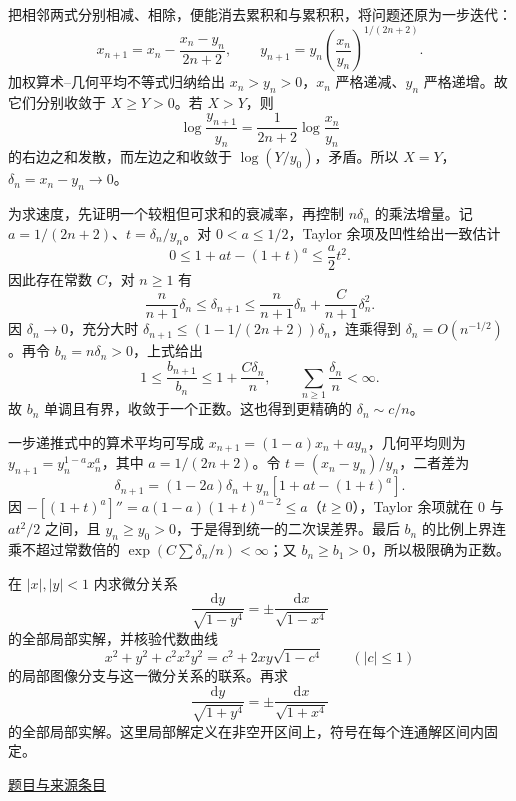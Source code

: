 \documentclass[12pt,fontset=fandol]{ctexart}
\begin{document}
\begin{solve}\label{ans:fin16-low:9}

把相邻两式分别相减、相除，便能消去累积和与累积积，将问题还原为一步迭代：
\[
x_{n+1}=x_n-\frac{x_n-y_n}{2n+2},\qquad
y_{n+1}=y_n\left(\frac{x_n}{y_n}\right)^{1/(2n+2)}.
\]
加权算术--几何平均不等式归纳给出 $x_n>y_n>0$，$x_n$ 严格递减、$y_n$ 严格递增。故它们分别收敛于 $X\ge Y>0$。若 $X>Y$，则
\[
\log\frac{y_{n+1}}{y_n}=\frac1{2n+2}\log\frac{x_n}{y_n}
\]
的右边之和发散，而左边之和收敛于 $\log(Y/y_0)$，矛盾。所以 $X=Y$，$\delta_n=x_n-y_n\to0$。

为求速度，先证明一个较粗但可求和的衰减率，再控制 $n\delta_n$ 的乘法增量。记 $a=1/(2n+2)$、$t=\delta_n/y_n$。对 $0<a\le1/2$，Taylor 余项及凹性给出一致估计
\[
0\le1+at-(1+t)^a\le\frac a2t^2.
\]
因此存在常数 $C$，对 $n\ge1$ 有
\[
\frac n{n+1}\delta_n\le\delta_{n+1}
\le\frac n{n+1}\delta_n+\frac C{n+1}\delta_n^2.
\]
因 $\delta_n\to0$，充分大时 $\delta_{n+1}\le(1-1/(2n+2))\delta_n$，连乘得到 $\delta_n=O(n^{-1/2})$。再令 $b_n=n\delta_n>0$，上式给出
\[
1\le\frac{b_{n+1}}{b_n}\le1+\frac{C\delta_n}{n},
\qquad\sum_{n\ge1}\frac{\delta_n}{n}<\infty.
\]
故 $b_n$ 单调且有界，收敛于一个正数。这也得到更精确的 $\delta_n\sim c/n$。

一步递推式中的算术平均可写成 $x_{n+1}=(1-a)x_n+ay_n$，几何平均则为 $y_{n+1}=y_n^{1-a}x_n^a$，其中 $a=1/(2n+2)$。令 $t=(x_n-y_n)/y_n$，二者差为
\[
\delta_{n+1}=(1-2a)\delta_n+y_n[1+at-(1+t)^a].
\]
因 $-[(1+t)^a]''=a(1-a)(1+t)^{a-2}\le a$（$t\ge0$），Taylor 余项就在 $0$ 与 $at^2/2$ 之间，且 $y_n\ge y_0>0$，于是得到统一的二次误差界。最后 $b_n$ 的比例上界连乘不超过常数倍的 $\exp(C\sum\delta_n/n)<\infty$；又 $b_n\ge b_1>0$，所以极限确为正数。

\end{solve}

\begin{example}\label{ex:fin16-low:10}\label{pr:fin16-low:10}

在 $|x|,|y|<1$ 内求微分关系
\[
\frac{\mathrm dy}{\sqrt{1-y^4}}=\pm\frac{\mathrm dx}{\sqrt{1-x^4}}
\]
的全部局部实解，并核验代数曲线
\[
x^2+y^2+c^2x^2y^2=c^2+2xy\sqrt{1-c^4}\qquad(|c|\le1)
\]
的局部图像分支与这一微分关系的联系。再求
\[
\frac{\mathrm dy}{\sqrt{1+y^4}}=\pm\frac{\mathrm dx}{\sqrt{1+x^4}}
\]
的全部局部实解。这里局部解定义在非空开区间上，符号在每个连通解区间内固定。

\par\href{https://github.com/lzxcr/cmc-mathematics/blob/64916fa1fdbc3e444a652eca204d5669058ee321/src/problems/finals/16/12.md}{题目与来源条目}

\end{example}
\end{document}
